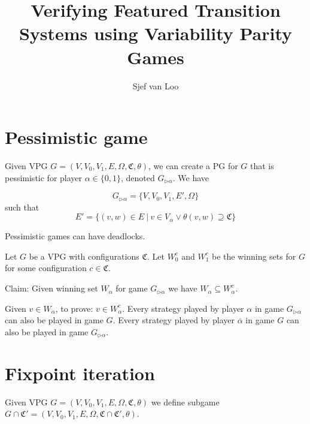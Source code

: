 \documentclass[]{article}
\title{Verifying Featured Transition Systems using Variability Parity Games}
\author{Sjef van Loo}
\begin{document}
	\section{Pessimistic game}
		Given VPG $G = (V,V_0,V_1,E,\Omega, \mathfrak{C},\theta)$, we can create a PG for $G$ that is pessimistic for player $\alpha \in \{0,1\}$, denoted $G_{\triangleright\alpha}$. We have
		
		\[ G_{\triangleright\alpha} = \{V,V_0,V_1,E',\Omega \} \]
		such that
		\[ E' = \{ (v,w) \in E\ |\ v \in V_{\overline{\alpha}} \vee \theta(v,w) \supseteq \mathfrak{C} \} \]
		
		Pessimistic games can have deadlocks.
		
Let $G$ be a VPG with configurations $\mathfrak{C}$. Let $W_0^c$ and $W_1^c$ be the winning sets for $G$ for some configuration $c \in \mathfrak{C}$.

Claim: Given winning set $W_\alpha$ for game $G_{\triangleright\alpha}$ we have $W_\alpha \subseteq W_\alpha^c$.

Given $v \in W_\alpha$, to prove: $v \in W_\alpha^c$. Every strategy played by player $\alpha$ in game $G_{\triangleright\alpha}$ can also be played in game $G$. Every strategy played by player $\overline{\alpha}$ in game $G$ can also be played in game $G_{\triangleright\alpha}$.

\section{Fixpoint iteration}
Given VPG $G = (V,V_0,V_1,E,\Omega, \mathfrak{C}, \theta)$ we define subgame $G \cap \mathfrak{C}' = (V,V_0,V_1,E,\Omega,\mathfrak{C} \cap \mathfrak{C}',\theta)$.
\end{document}
